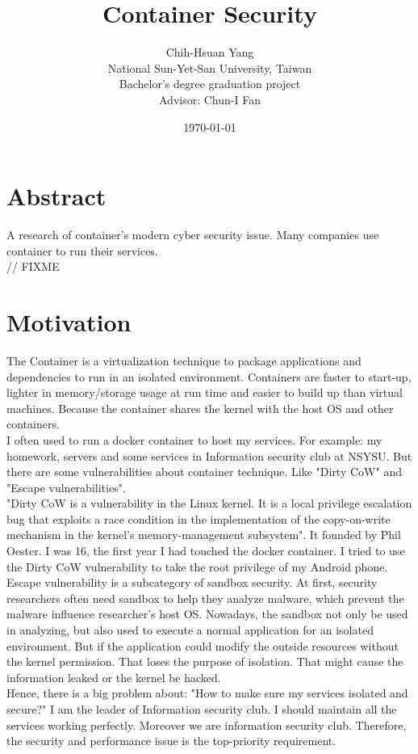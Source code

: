 \documentclass[12pt,a4paper,oneside,draft]{IEEEconf}
\title{{\mytitle Container Security}}
\author{Chih-Hsuan Yang\\

National Sun-Yet-San University, Taiwan \\
Bachelor's degree graduation project \\

Advisor: Chun-I Fan
}
\date{\today}
\begin{document}
\maketitle


\section{Abstract}
A research of container's modern cyber security issue.
Many companies use container to run their services.\\
// FIXME

\section{Motivation}
The Container is a virtualization technique to package applications and dependencies to run in
an isolated environment. Containers are faster to start-up, lighter in memory/storage usage
at run time and easier to build up than virtual machines. Because the container shares the
kernel with the host OS and other containers.\\
I often used to run a docker container to host my services. For example: my homework,
servers and some services in Information security club at NSYSU.
But there are some vulnerabilities about container technique. Like "Dirty CoW\cite{Dirty_CoW}"
and "Escape vulnerabilities".\\
"Dirty CoW is a vulnerability in the Linux kernel. It is a local privilege escalation bug
that exploits a race condition in the implementation of the copy-on-write mechanism in the
kernel's memory-management subsystem"\cite{Dirty_CoW_wiki}. It founded by Phil Oester. I
was 16, the first year I had touched the docker container. I tried to use the Dirty CoW
vulnerability to take the root privilege of my Android phone.\\
Escape vulnerability is a subcategory of sandbox security. At first, security researchers often
need sandbox to help they analyze malware, which prevent the malware influence researcher's
host OS. Nowadays, the sandbox not only be used in analyzing, but also used to execute a
normal application for an isolated environment. But if the application could modify the
outside resources without the kernel permission. That loses the purpose of isolation. That
might cause the information leaked or the kernel be hacked.\\
Hence, there is a big problem about: "How to make sure my services isolated and secure?" I
am the leader of Information security club. I should maintain all the services working
perfectly. Moreover we are information security club. Therefore, the security and performance
issue is the top-priority requirement.\\
\end{document}
